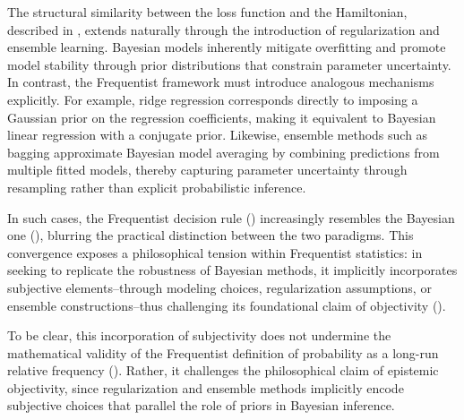 \begin{remark}
	\label{rm:philosophical_challenge}
	The structural similarity between the loss function and the Hamiltonian, described in , extends naturally through the introduction of regularization and ensemble learning. Bayesian models inherently mitigate overfitting and promote model stability through prior distributions that constrain parameter uncertainty. In contrast, the Frequentist framework must introduce analogous mechanisms explicitly. For example, ridge regression corresponds directly to imposing a Gaussian prior on the regression coefficients, making it equivalent to Bayesian linear regression with a conjugate prior. Likewise, ensemble methods such as bagging approximate Bayesian model averaging by combining predictions from multiple fitted models, thereby capturing parameter uncertainty through resampling rather than explicit probabilistic inference.
	
	In such cases, the Frequentist decision rule () increasingly resembles the Bayesian one (), blurring the practical distinction between the two paradigms. This convergence exposes a philosophical tension within Frequentist statistics: in seeking to replicate the robustness of Bayesian methods, it implicitly incorporates subjective elements--through modeling choices, regularization assumptions, or ensemble constructions--thus challenging its foundational claim of objectivity (). 
	
	To be clear, this incorporation of subjectivity does not undermine the mathematical validity of the Frequentist definition of probability as a long-run relative frequency (). Rather, it challenges the philosophical claim of epistemic objectivity, since regularization and ensemble methods implicitly encode subjective choices that parallel the role of priors in Bayesian inference.
\end{remark}


